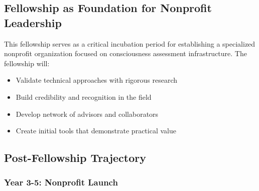 \documentclass[11pt,a4paper]{article}
\begin{document}




\subsection{Fellowship as Foundation for Nonprofit Leadership}

This fellowship serves as a critical incubation period for establishing a specialized nonprofit organization focused on consciousness assessment infrastructure. The fellowship will:

\begin{itemize}
    \item Validate technical approaches with rigorous research
    \item Build credibility and recognition in the field
    \item Develop network of advisors and collaborators
    \item Create initial tools that demonstrate practical value
\end{itemize}

\subsection{Post-Fellowship Trajectory}

\subsubsection{Year 3-5: Nonprofit Launch}
\end{document}

